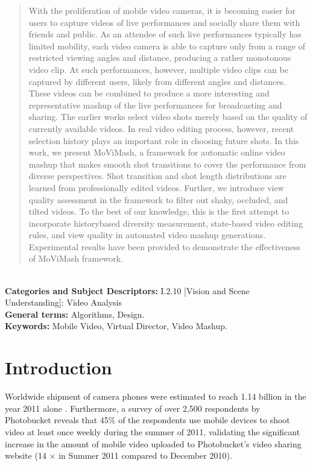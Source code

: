 \documentclass{sig-alternate}
\providecommand{\DIFadd}[1]{{\protect\color{blue}\uwave{#1}}} %
\providecommand{\DIFaddbegin}{} %
\providecommand{\DIFaddend}{} %
\begin{document}
\maketitle
\begin{abstract}
With the proliferation of mobile video cameras, it is becoming easier
for users to capture videos of live performances and socially
share them with friends and public. As an attendee of such live
performances typically has limited mobility, each video camera is
able to capture only from a range of restricted viewing angles and
distance, producing a rather monotonous video clip. At such performances,
however, multiple video clips can be captured by different
users, likely from different angles and distances. These videos
can be combined to produce a more interesting and representative
mashup of the live performances for broadcasting and sharing. The
earlier works select video shots merely based on the quality of currently
available videos. In real video editing process, however, recent
selection history plays an important role in choosing future
shots. In this work, we present MoViMash, a framework for automatic
online video mashup that makes smooth shot transitions to
cover the performance from diverse perspectives. Shot transition
and shot length distributions are learned from professionally edited
videos. Further, we introduce view quality assessment in the framework
to filter out shaky, occluded, and tilted videos. To the best
of our knowledge, this is the first attempt to incorporate historybased
diversity measurement, state-based video editing rules, and
view quality in automated video mashup generations. Experimental
results have been provided to demonstrate the effectiveness of
MoViMash framework.
\end{abstract}\\
\textbf{Categories and Subject Descriptors:} I.2.10 [Vision and Scene Understanding]: Video Analysis\\
\textbf{General terms:} Algorithms, Design.\\
\textbf{Keywords:} Mobile Video, Virtual Director, Video Mashup.


\section{Introduction}\label{intro}
\DIFaddbegin \DIFadd{My name is Parul.
}\DIFaddend Worldwide shipment of camera phones were estimated to reach
1.14 billion in the year 2011 alone \cite{1}. Furthermore, a survey of over 2,500 respondents by Photobucket reveals that 45\% of the respondents use mobile devices to shoot video at least once weekly during the summer of 2011, validating the significant increase in
the amount of mobile video uploaded to Photobucket's video sharing
website (14 $\times$ in Summer 2011 compared to December 2010)\cite{2}.
\end{document}
